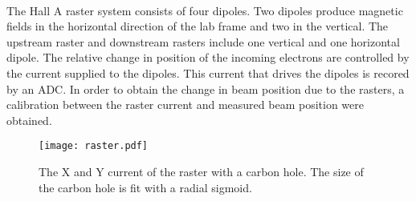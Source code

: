	 \paragraph{} The Hall A raster system consists of four dipoles. Two dipoles produce magnetic fields in the horizontal direction of the lab frame and two in the vertical. The upstream raster and downstream rasters include one vertical and one horizontal dipole. The relative change in position of the incoming electrons are controlled by the current supplied to the dipoles. This current that drives the dipoles is recored by an ADC. In order to obtain the change in beam position due to the rasters, a calibration between the raster current and measured beam position were obtained.  
	  \begin{figure}[h]
	 	\centering
	  	\texttt{[image: raster.pdf]} 
	 	\caption{The X and Y current of the raster with a carbon hole. The size of the carbon hole is fit with a radial sigmoid\cite{Trast}.}
	 	\label{fig:raster}
	 \end{figure} 
